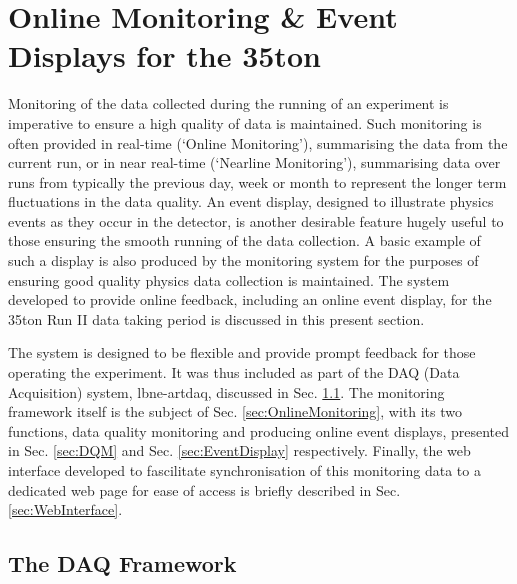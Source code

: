 
\chapter{Online Monitoring \& Event Displays for the 35ton}

Monitoring of the data collected during the running of an experiment is imperative to ensure a high quality of data is maintained.  Such monitoring is often provided in real-time (`Online Monitoring'), summarising the data from the current run, or in near real-time (`Nearline Monitoring'), summarising data over runs from typically the previous day, week or month to represent the longer term fluctuations in the data quality.  An event display, designed to illustrate physics events as they occur in the detector, is another desirable feature hugely useful to those ensuring the smooth running of the data collection.  A basic example of such a display is also produced by the monitoring system for the purposes of ensuring good quality physics data collection is maintained.  The system developed to provide online feedback, including an online event display, for the 35ton Run II data taking period is discussed in this present section.

The system is designed to be flexible and provide prompt feedback for those operating the experiment.  It was thus included as part of the DAQ (Data Acquisition) system, lbne-artdaq, discussed in Sec. \ref{sec:lbne-artdaq}.  The monitoring framework itself is the subject of Sec. \ref{sec:OnlineMonitoring}, with its two functions, data quality monitoring and producing online event displays, presented in Sec. \ref{sec:DQM} and Sec. \ref{sec:EventDisplay} respectively.  Finally, the web interface developed to fascilitate synchronisation of this monitoring data to a dedicated web page for ease of access is briefly described in Sec. \ref{sec:WebInterface}.

\section{The DAQ Framework}\label{sec:lbne-artdaq}

